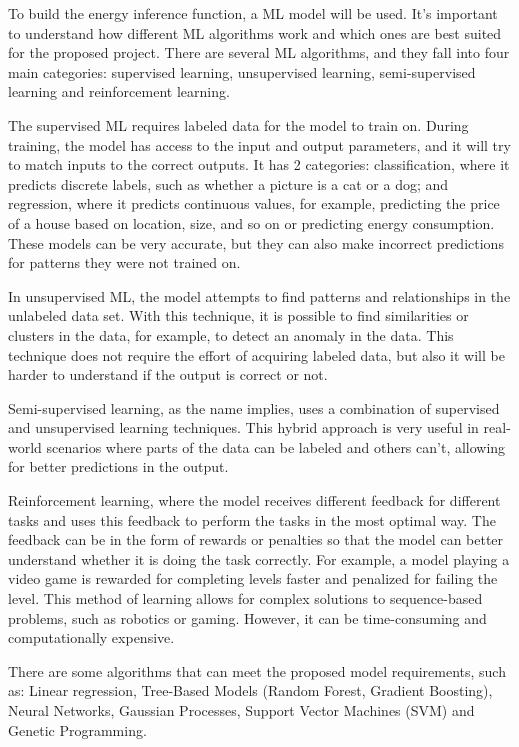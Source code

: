 To build the energy inference function, a ML model will be used. It's important to understand how different ML algorithms work and which ones are best suited for the proposed project. There are several ML algorithms, and they fall into four main categories\cite{sarker2021machine}: supervised learning, unsupervised learning, semi-supervised learning and reinforcement learning.

The supervised ML requires labeled data for the model to train on. During training, the model has access to the input and output parameters, and it will try to match inputs to the correct outputs. It has 2 categories: classification, where it predicts discrete labels, such as whether a picture is a cat or a dog; and regression, where it predicts continuous values, for example, predicting the price of a house based on location, size, and so on or predicting energy consumption. These models can be very accurate, but they can also make incorrect predictions for patterns they were not trained on.

In unsupervised ML, the model attempts to find patterns and relationships in the unlabeled data set. With this technique, it is possible to find similarities or clusters in the data, for example, to detect an anomaly in the data. This technique does not require the effort of acquiring labeled data, but also it will be harder to understand if the output is correct or not.

Semi-supervised learning, as the name implies, uses a combination of supervised and unsupervised learning techniques. This hybrid approach is very useful in real-world scenarios where parts of the data can be labeled and others can't, allowing for better predictions in the output.

Reinforcement learning, where the model receives different feedback for different tasks and uses this feedback to perform the tasks in the most optimal way. The feedback can be in the form of rewards or penalties so that the model can better understand whether it is doing the task correctly. For example, a model playing a video game is rewarded for completing levels faster and penalized for failing the level. This method of learning allows for complex solutions to sequence-based problems, such as robotics or gaming. However, it can be time-consuming and computationally expensive.

There are some algorithms that can meet the proposed model requirements, such as: Linear regression, Tree-Based Models (Random Forest, Gradient Boosting), Neural Networks, Gaussian Processes, Support Vector Machines (SVM) and Genetic Programming.


